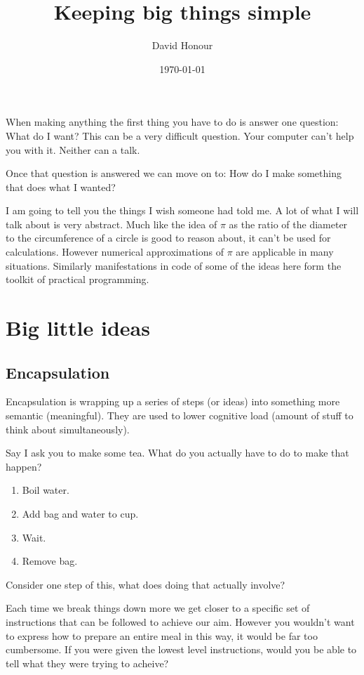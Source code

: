 \documentclass{article}
\title{Keeping big things simple}
\author{David Honour}
\date{\today}
\begin{document}
\maketitle

When making anything the first thing you have to do is answer one question:
What do I want?
This can be a very difficult question.
Your computer can't help you with it.
Neither can a talk.

Once that question is answered we can move on to:
How do I make something that does what I wanted?

I am going to tell you the things I wish someone had told me.
A lot of what I will talk about is very abstract.
Much like the idea of $\pi$ as the ratio of the diameter to the circumference
of a circle is good to reason about, it can't be used for calculations.
However numerical approximations of $\pi$ are applicable in many situations.
Similarly manifestations in code of some of the ideas here form the toolkit of
practical programming.

\section{Big little ideas}
\subsection{Encapsulation}
Encapsulation is wrapping up a series of steps (or ideas) into something more
semantic (meaningful). They are used to lower cognitive load (amount of stuff
to think about simultaneously).

Say I ask you to make some tea.
What do you actually have to do to make that happen?
\begin{enumerate}
\item Boil water.
\item Add bag and water to cup.
\item Wait.
\item Remove bag.
\end{enumerate}
Consider one step of this, what does doing that actually involve?

Each time we break things down more we get closer to a specific set of
instructions that can be followed to achieve our aim. However you wouldn't want
to express how to prepare an entire meal in this way, it would be far too
cumbersome. If you were given the lowest level instructions, would you be able
to tell what they were trying to acheive?
\end{document}
